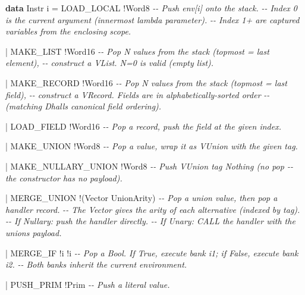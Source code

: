 \documentclass[]{article}
\newenvironment{Shaded}{}{}
\newcommand{\CommentTok}[1]{\textcolor[rgb]{0.38,0.63,0.69}{\textit{#1}}}
\newcommand{\DataTypeTok}[1]{\textcolor[rgb]{0.56,0.13,0.00}{#1}}
\newcommand{\KeywordTok}[1]{\textcolor[rgb]{0.00,0.44,0.13}{\textbf{#1}}}
\newcommand{\NormalTok}[1]{#1}
\newcommand{\OperatorTok}[1]{\textcolor[rgb]{0.40,0.40,0.40}{#1}}
\newcommand{\OtherTok}[1]{\textcolor[rgb]{0.00,0.44,0.13}{#1}}
\begin{document}
\begin{Shaded}
\begin{Highlighting}[]
\KeywordTok{data} \DataTypeTok{Instr}\NormalTok{ i}
    \OtherTok{=} \DataTypeTok{LOAD\_LOCAL} \OperatorTok{!}\DataTypeTok{Word8}
    \CommentTok{{-}{-} Push env[i] onto the stack.}
    \CommentTok{{-}{-} Index 0 is the current argument (innermost lambda parameter).}
    \CommentTok{{-}{-} Index 1+ are captured variables from the enclosing scope.}

    \OperatorTok{|} \DataTypeTok{MAKE\_LIST} \OperatorTok{!}\DataTypeTok{Word16}
    \CommentTok{{-}{-} Pop N values from the stack (topmost = last element),}
    \CommentTok{{-}{-} construct a VList. N=0 is valid (empty list).}

    \OperatorTok{|} \DataTypeTok{MAKE\_RECORD} \OperatorTok{!}\DataTypeTok{Word16}
    \CommentTok{{-}{-} Pop N values from the stack (topmost = last field),}
    \CommentTok{{-}{-} construct a VRecord. Fields are in alphabetically{-}sorted order}
    \CommentTok{{-}{-} (matching Dhall\textquotesingle{}s canonical field ordering).}

    \OperatorTok{|} \DataTypeTok{LOAD\_FIELD} \OperatorTok{!}\DataTypeTok{Word16}
    \CommentTok{{-}{-} Pop a record, push the field at the given index.}

    \OperatorTok{|} \DataTypeTok{MAKE\_UNION} \OperatorTok{!}\DataTypeTok{Word8}
    \CommentTok{{-}{-} Pop a value, wrap it as VUnion with the given tag.}

    \OperatorTok{|} \DataTypeTok{MAKE\_NULLARY\_UNION} \OperatorTok{!}\DataTypeTok{Word8}
    \CommentTok{{-}{-} Push VUnion tag Nothing (no pop {-}{-} the constructor has no payload).}

    \OperatorTok{|} \DataTypeTok{MERGE\_UNION} \OperatorTok{!}\NormalTok{(}\DataTypeTok{Vector} \DataTypeTok{UnionArity}\NormalTok{)}
    \CommentTok{{-}{-} Pop a union value, then pop a handler record.}
    \CommentTok{{-}{-} The Vector gives the arity of each alternative (indexed by tag).}
    \CommentTok{{-}{-} If Nullary: push the handler directly.}
    \CommentTok{{-}{-} If Unary: CALL the handler with the union\textquotesingle{}s payload.}

    \OperatorTok{|} \DataTypeTok{MERGE\_IF} \OperatorTok{!}\NormalTok{i }\OperatorTok{!}\NormalTok{i}
    \CommentTok{{-}{-} Pop a Bool. If True, execute bank i1; if False, execute bank i2.}
    \CommentTok{{-}{-} Both banks inherit the current environment.}

    \OperatorTok{|} \DataTypeTok{PUSH\_PRIM} \OperatorTok{!}\DataTypeTok{Prim}
    \CommentTok{{-}{-} Push a literal value.}


\end{Highlighting}
\end{Shaded}
\end{document}
